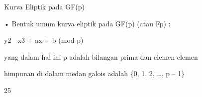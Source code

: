 \documentclass{article}
\begin{document}

Kurva Eliptik pada GF(p)

• Bentuk umum kurva eliptik pada GF(p) (atau Fp) :


y2  x3 + ax + b  (mod p)

 yang dalam hal ini p adalah bilangan prima dan elemen-elemen 

himpunan di dalam medan galois adalah \{0, 1, 2, …, p – 1\}

25
\end{document}
